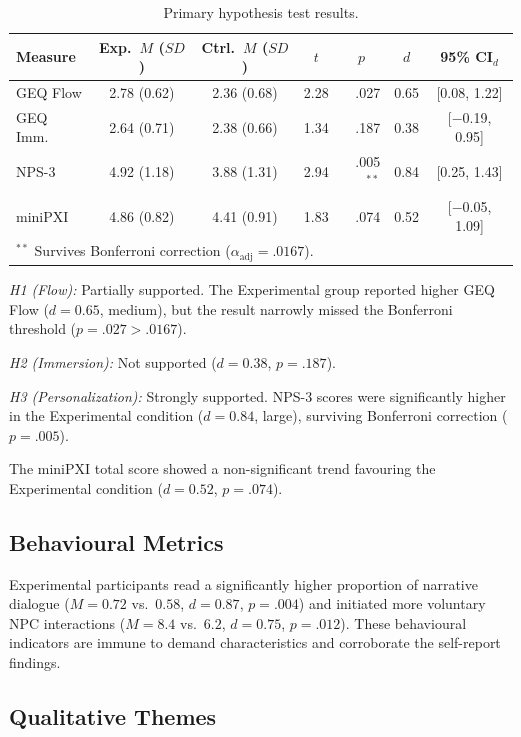 \documentclass[conference]{IEEEtran}
\begin{document}
\begin{table}[htbp]
\centering
\caption{Primary hypothesis test results.}
\label{tab:results}
\scriptsize
\setlength{\tabcolsep}{3pt}
\begin{tabular}{@{}l c c r r r c@{}}
\toprule
\textbf{Measure} & \textbf{Exp.\ $M$ ($SD$)} & \textbf{Ctrl.\ $M$ ($SD$)} & \multicolumn{1}{c}{$t$} & \multicolumn{1}{c}{$p$} & \multicolumn{1}{c}{$d$} & \textbf{95\% CI$_d$} \\
\midrule
GEQ Flow & 2.78 (0.62) & 2.36 (0.68) & 2.28 & .027 & 0.65 & [0.08, 1.22] \\
GEQ Imm. & 2.64 (0.71) & 2.38 (0.66) & 1.34 & .187 & 0.38 & [$-$0.19, 0.95] \\
NPS-3 & 4.92 (1.18) & 3.88 (1.31) & 2.94 & .005$^{**}$ & 0.84 & [0.25, 1.43] \\
miniPXI & 4.86 (0.82) & 4.41 (0.91) & 1.83 & .074 & 0.52 & [$-$0.05, 1.09] \\
\bottomrule
\multicolumn{7}{l}{\scriptsize $^{**}$ Survives Bonferroni correction ($\alpha_{\text{adj}} = .0167$).}
\end{tabular}
\end{table}

\textit{H1 (Flow):} Partially supported. The Experimental group reported higher GEQ Flow ($d = 0.65$, medium), but the result narrowly missed the Bonferroni threshold ($p = .027 > .0167$).

\textit{H2 (Immersion):} Not supported ($d = 0.38$, $p = .187$).

\textit{H3 (Personalization):} Strongly supported. NPS-3 scores were significantly higher in the Experimental condition ($d = 0.84$, large), surviving Bonferroni correction ($p = .005$).

The miniPXI total score showed a non-significant trend favouring the Experimental condition ($d = 0.52$, $p = .074$).

\subsection{Behavioural Metrics}

Experimental participants read a significantly higher proportion of narrative dialogue ($M = 0.72$ vs.\ $0.58$, $d = 0.87$, $p = .004$) and initiated more voluntary NPC interactions ($M = 8.4$ vs.\ $6.2$, $d = 0.75$, $p = .012$). These behavioural indicators are immune to demand characteristics and corroborate the self-report findings.

\subsection{Qualitative Themes}
\end{document}
